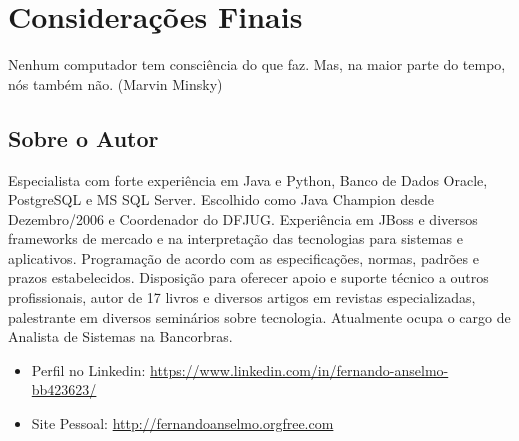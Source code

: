 \documentclass[a4paper,11pt]{book} %
\begin{document}

\pagestyle{empty} %
\tableofcontents %
\cleardoublepage %
\pagestyle{fancy} %
\clearpage %






% 
\appendix
\chapter{Considerações Finais}
\begin{remark}
Nenhum computador tem consciência do que faz. 
Mas, na maior parte do tempo, nós também não. (Marvin Minsky)
\end{remark}

\section{Sobre o Autor}
Especialista com forte experiência em Java e Python, Banco de Dados Oracle, PostgreSQL e MS SQL Server. Escolhido como Java Champion desde Dezembro/2006 e Coordenador do DFJUG. Experiência em JBoss e diversos frameworks de mercado e na interpretação das tecnologias para sistemas e aplicativos. Programação de acordo com as especificações, normas, padrões e prazos estabelecidos. Disposição para oferecer apoio e suporte técnico a outros profissionais, autor de 17 livros e diversos artigos em revistas especializadas, palestrante em diversos seminários sobre tecnologia. Atualmente ocupa o cargo de Analista de Sistemas na Bancorbras.
\begin{itemize}
 \item Perfil no Linkedin: \url{https://www.linkedin.com/in/fernando-anselmo-bb423623/}
 \item Site Pessoal: \url{http://fernandoanselmo.orgfree.com} 
\end{itemize}
\end{document}
